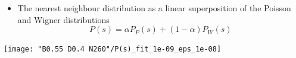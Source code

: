 \documentclass[a4,compress]{beamer}
\begin{document}

\begin{frame}
  \begin{itemize}
    \item The nearest neighbour distribution as a linear superposition
    of the Poisson and Wigner distributions
    \[
      P(s) = \alpha P_P(s) + (1-\alpha) P_W(s)
    \]
  \end{itemize}
\end{frame}


\begin{frame}
  \texttt{[image: "B0.55 D0.4 N260"/P(s)\_fit\_1e-09\_eps\_1e-08]}  %
\end{frame}

\end{document}
